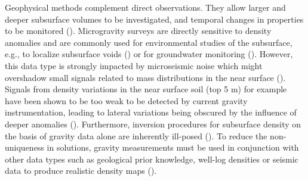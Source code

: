 \documentclass{article}
\begin{document}
	Geophysical methods complement direct observations. They allow larger and deeper subsurface volumes to be investigated, and temporal changes in properties to be monitored (\cite{parsekian2015multiscale}).  Microgravity surveys are directly sensitive to density anomalies and are commonly used for environmental studies of the subsurface, e.g., to localize subsurface voids (\cite{tuckwell2008use}) or for groundwater monitoring (\cite{piccolroaz2015use}). However, this data type is strongly impacted by microseismic noise which might overshadow small signals related to mass distributions in the near surface (\cite{boddice2022microgravity}). Signals from density variations in the near surface soil (top 5 m) for example have been shown to be too weak to be detected by current gravity instrumentation, leading to lateral variations being obscured by the influence of deeper anomalies (\cite{boddice2019quantifying}). Furthermore, inversion procedures for subsurface density on the basis of gravity data alone are inherently ill-posed (\cite{blom2017synthetic}). To reduce the non-uniqueness in solutions, gravity measurements must be used in conjunction with other data types such as geological prior knowledge, well-log densities or seismic data to produce realistic density maps (\cite{nabighian2005historical}). \\ %
	
	
\end{document}
